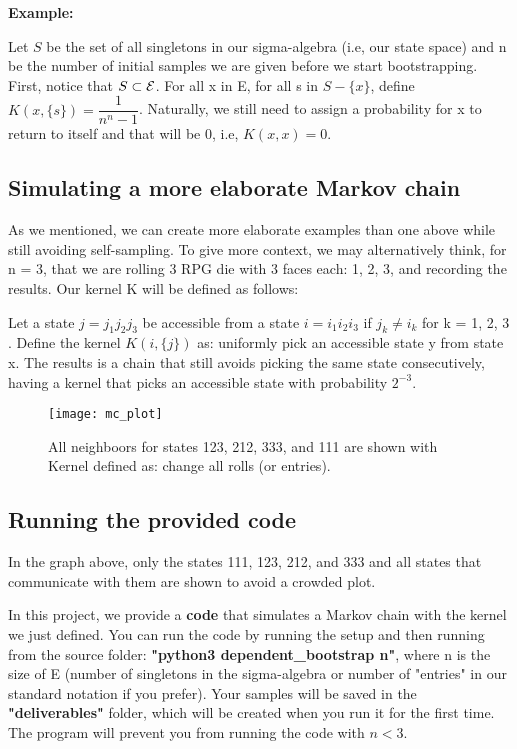 \textbf{Example:}

Let $S$ be the set of all singletons in our sigma-algebra (i.e, our state space) and n be the number of initial samples we are given before we start bootstrapping. First, notice that $S \subset \mathcal{E}$.
For all x in E, for all s in $S - \{x\}$, define $K(x, \{s\}) = \dfrac{1}{n^n-1}$. Naturally, we still need to assign a probability for x to return to itself and that will be 0, i.e, $K(x,x) = 0$.

\subsection{Simulating a more elaborate Markov chain}

As we mentioned, we can create more elaborate examples than one above while still avoiding self-sampling. To give more context, we may alternatively think, for n = 3, that we are rolling 3 RPG die with 3 faces each: 1, 2, 3, and recording the results. Our kernel K will be defined as follows:

Let a state $j = j_1j_2j_3$ be accessible from a state $i = i_1i_2i_3$ if $j_k \neq i_k$ for k = 1, 2, 3 . Define the kernel $K(i, \{j\})$ as: uniformly pick an accessible state y from state x. The results is a chain that still avoids picking the same state consecutively, having a kernel that picks an accessible state with probability $2^{-3}$.

\begin{figure}
  \centering
	{\texttt{[image: mc\_plot]}}
	  \caption{All neighboors for states 123, 212, 333, and 111 are shown with Kernel defined as: change all rolls (or entries).}
\end{figure}


\subsection{Running the provided code}
In the graph above, only the states 111, 123, 212, and 333 and all states that communicate with them are shown to avoid a crowded plot.

In this project, we provide a \textbf{code} that simulates a Markov chain with the kernel we just defined. You can run the code by running the setup and then running from the source folder: \textbf{"python3 dependent\_bootstrap n"}, where n is the size of E (number of singletons in the sigma-algebra or number of "entries" in our standard notation if you prefer). Your samples will be saved in the \textbf{"deliverables"} folder, which will be created when you run it for the first time. The program will prevent you from running the code with $n < 3$.


